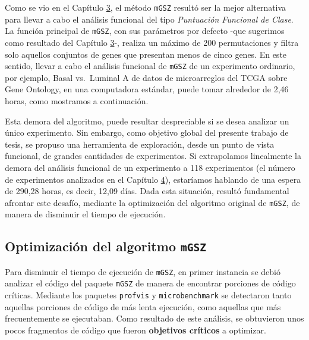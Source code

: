 \documentclass[12pt,twoside]{reedthesis}
\begin{document}
\par

Como se vio en el Capítulo \protect\hyperlink{cap:ifa}{3}, el método \texttt{mGSZ} resultó ser la mejor alternativa para llevar a cabo el análisis funcional del tipo \emph{Puntuación Funcional de Clase}. La función principal de \texttt{mGSZ}, con sus parámetros por defecto -que sugerimos como resultado del Capítulo \protect\hyperlink{cap:ifa}{3}-, realiza un máximo de 200 permutaciones y filtra solo aquellos conjuntos de genes que presentan menos de cinco genes. En este sentido, llevar a cabo el análisis funcional de \texttt{mGSZ} de un experimento ordinario, por ejemplo, Basal vs.~Luminal A de datos de microarreglos del TCGA sobre Gene Ontology, en una computadora estándar, puede tomar alrededor de 2,46 horas, como mostramos a continuación.

\par

Esta demora del algoritmo, puede resultar despreciable si se desea analizar un único experimento. Sin embargo, como objetivo global del presente trabajo de tesis, se propuso una herramienta de exploración, desde un punto de vista funcional, de grandes cantidades de experimentos. Si extrapolamos linealmente la demora del análisis funcional de un experimento a 118 experimentos (el número de experimentos analizados en el Capítulo \protect\hyperlink{cap:migsa}{4}), estaríamos hablando de una espera de 290,28 horas, es decir, 12,09 días. Dada esta situación, resultó fundamental afrontar este desafío, mediante la optimización del algoritmo original de \texttt{mGSZ}, de manera de disminuir el tiempo de ejecución.

\hypertarget{optimizacion-del-algoritmo-mgsz}{%
\subsection{\texorpdfstring{Optimización del algoritmo \texttt{mGSZ}}{Optimización del algoritmo mGSZ}}\label{optimizacion-del-algoritmo-mgsz}}

\par

Para disminuir el tiempo de ejecución de \texttt{mGSZ}, en primer instancia se debió analizar el código del paquete \texttt{mGSZ} de manera de encontrar porciones de código críticas. Mediante los paquetes \texttt{profvis} y \texttt{microbenchmark} se detectaron tanto aquellas porciones de código de más lenta ejecución, como aquellas que más frecuentemente se ejecutaban. Como resultado de este análisis, se obtuvieron unos pocos fragmentos de código que fueron \textbf{objetivos críticos} a optimizar.
\end{document}

